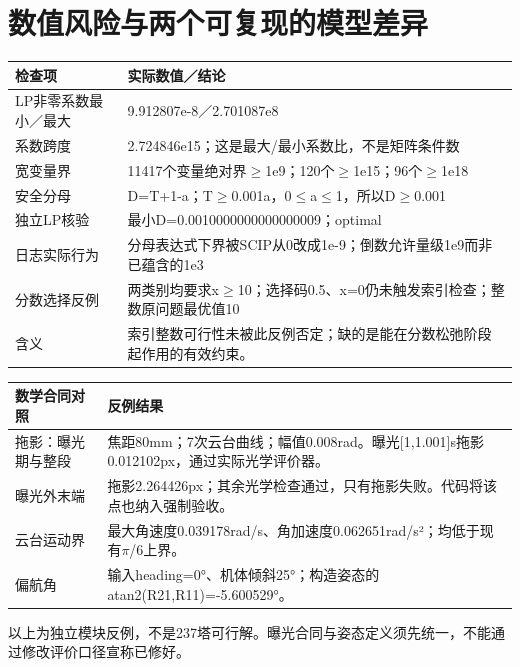 \section*{数值风险与两个可复现的模型差异}
\begin{center}\small\begin{tabular}{p{40mm}p{123mm}}\toprule 检查项 & 实际数值／结论\\\midrule
LP非零系数最小／最大 & 9.912807e-8／2.701087e8\\
系数跨度 & 2.724846e15；这是最大/最小系数比，不是矩阵条件数\\
宽变量界 & 11417个变量绝对界$\ge$1e9；120个$\ge$1e15；96个$\ge$1e18\\
安全分母 & D=T+1-a；T$\ge$0.001a，0$\le$a$\le$1，所以D$\ge$0.001\\
独立LP核验 & 最小D=0.0010000000000000009；optimal\\
日志实际行为 & 分母表达式下界被SCIP从0改成1e-9；倒数允许量级1e9而非已蕴含的1e3\\
分数选择反例 & 两类别均要求x$\ge$10；选择码0.5、x=0仍未触发索引检查；整数原问题最优值10\\
含义 & 索引整数可行性未被此反例否定；缺的是能在分数松弛阶段起作用的有效约束。\\
\bottomrule\end{tabular}\end{center}\begin{center}\small\begin{tabular}{p{40mm}p{123mm}}\toprule 数学合同对照 & 反例结果\\\midrule
拖影：曝光期与整段 & 焦距80mm；7次云台曲线；幅值0.008rad。曝光[1,1.001]s拖影0.012102px，通过实际光学评价器。\\
曝光外末端 & 拖影2.264426px；其余光学检查通过，只有拖影失败。代码将该点也纳入强制验收。\\
云台运动界 & 最大角速度0.039178rad/s、角加速度0.062651rad/s²；均低于现有$\pi$/6上界。\\
偏航角 & 输入heading=0°、机体倾斜25°；构造姿态的atan2(R21,R11)=-5.600529°。\\
\bottomrule\end{tabular}\end{center}\small 以上为独立模块反例，不是237塔可行解。曝光合同与姿态定义须先统一，不能通过修改评价口径宣称已修好。
\clearpage
